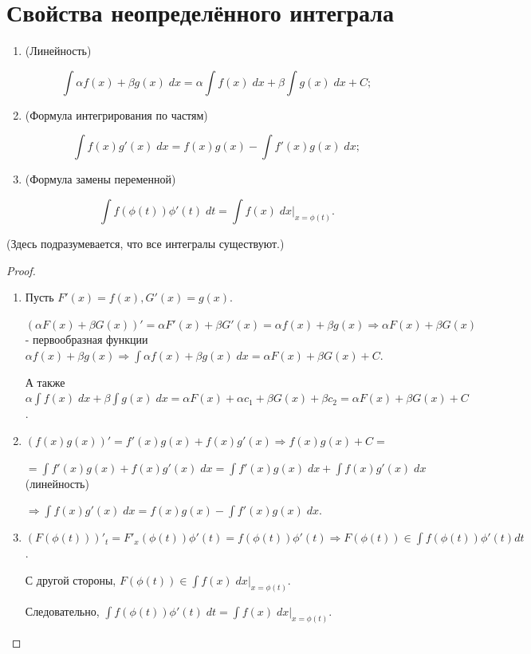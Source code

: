	\section{Свойства неопределённого интеграла}
	
	\begin{theorem}
		\begin{enumerate}
			\item (Линейность) 
			
			\[\int \alpha f(x) + \beta g(x) \; dx = \alpha \int f(x) \; dx + \beta \int g(x) \; dx + C;\]
			
			\item (Формула интегрирования по частям) 
			
			\[\int f(x)g'(x) \; dx = f(x)g(x) - \int f'(x)g(x) \; dx;\]
			
			\item (Формула замены переменной)
			
			\[\int f(\phi(t))\phi'(t) \; dt = \int f(x) \; dx\bigg|_{x=\phi(t)}.\]
			
		\end{enumerate}
		
	    (Здесь подразумевается, что все интегралы существуют.)
	\end{theorem}
	
	\begin{proof}
		\begin{enumerate}
			\item Пусть $F'(x) = f(x), G'(x) = g(x).$
			
			$(\alpha F(x) + \beta G(x))' = \alpha F'(x) + \beta G'(x) = \alpha f(x) + \beta g(x) \Rightarrow \alpha F(x) + \beta G(x)$ - первообразная функции $\alpha f(x) + \beta g(x) \Rightarrow \displaystyle\int \alpha f(x) + \beta g(x) \; dx = \alpha F(x) + \beta G(x) + C$.
					
			А также $\alpha \displaystyle\int f(x) \; dx + \beta \displaystyle\int g(x) \; dx = \alpha F(x) + \alpha c_1 + \beta G(x) + \beta c_2 = \alpha F(x) + \beta G(x) + C$.
			
			\item $(f(x)g(x))' = f'(x)g(x) + f(x)g'(x) \Rightarrow f(x)g(x) + C =$
			
			$=\displaystyle\int f'(x)g(x) + f(x)g'(x) \; dx = \displaystyle\int f'(x)g(x) \; dx + \displaystyle\int f(x)g'(x) \; dx$ (линейность)
			
			$\Rightarrow \displaystyle\int f(x)g'(x) \; dx = f(x)g(x) - \displaystyle\int f'(x)g(x) \; dx$.
			
			\item $(F(\phi(t)))'_t = F'_x(\phi(t))\phi'(t) = f(\phi(t))\phi'(t) \Rightarrow F(\phi(t)) \in \displaystyle\int f(\phi(t))\phi'(t)dt$.
			
			С другой стороны, $F(\phi(t)) \in \displaystyle\int f(x) \; dx \bigg|_{x=\phi(t)}$.
			
			Следовательно, $\displaystyle\int f(\phi(t))\phi'(t) \; dt = \displaystyle\int f(x) \; dx\bigg|_{x=\phi(t)}$.
		\end{enumerate}		
    \end{proof}
    
